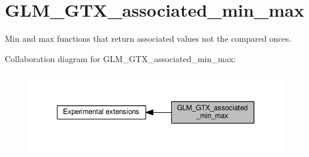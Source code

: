 \hypertarget{group__gtx__associated__min__max}{}\section{G\+L\+M\+\_\+\+G\+T\+X\+\_\+associated\+\_\+min\+\_\+max}
\label{group__gtx__associated__min__max}


Min and max functions that return associated values not the compared onces.  


Collaboration diagram for G\+L\+M\+\_\+\+G\+T\+X\+\_\+associated\+\_\+min\+\_\+max\+:
\nopagebreak
\begin{figure}[H]
\begin{center}
\leavevmode
\includegraphics[width=350pt]{d6/d10/group__gtx__associated__min__max}
\end{center}
\end{figure}
